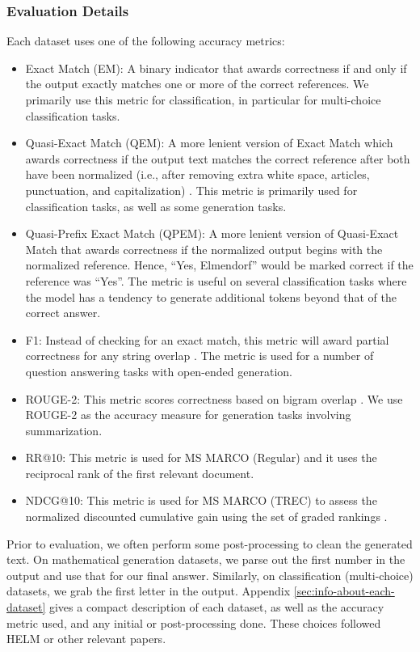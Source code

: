 \subsubsection{Evaluation Details}
Each dataset uses one of the following accuracy metrics:
\begin{itemize}
    \item Exact Match (EM): A binary indicator that awards correctness if and only if the output exactly matches one or more of the correct references. We primarily use this metric for classification, in particular for multi-choice classification tasks.
    \item Quasi-Exact Match (QEM): A more lenient version of Exact Match which awards correctness if the output text matches the correct reference after both have been normalized (i.e., after removing extra white space, articles, punctuation, and capitalization) \citep{choi-etal-2018-quac}. This metric is primarily used for classification tasks, as well as some generation tasks.
    \item Quasi-Prefix Exact Match (QPEM): A more lenient version of Quasi-Exact Match that awards correctness if the normalized output begins with the normalized reference. Hence, ``Yes, Elmendorf'' would be marked correct if the reference was ``Yes''. The metric is useful on several classification tasks where the model has a tendency to generate additional tokens beyond that of the correct answer.
    \item F1: Instead of checking for an exact match, this metric will award partial correctness for any string overlap \citep{rajpurkar-etal-2016-squad}. The metric is used for a number of question answering tasks with open-ended generation.
    \item ROUGE-2: This metric scores correctness based on bigram overlap \citep{lin-2004-rouge}. We use ROUGE-2 as the accuracy measure for generation tasks involving summarization.
    \item RR@10: This metric is used for MS MARCO (Regular) and it uses the reciprocal rank of the first relevant document. 
    \item NDCG@10: This metric is used for MS MARCO (TREC) to assess the normalized discounted cumulative gain using the set of graded rankings \citep{ndcg}. 
\end{itemize}

Prior to evaluation, we often perform some post-processing to clean the generated text. On mathematical generation datasets, we parse out the first number in the output and use that for our final answer. Similarly, on classification (multi-choice) datasets, we grab the first letter in the output. Appendix \ref{sec:info-about-each-dataset} gives a compact description of each dataset, as well as the accuracy metric used, and any initial or post-processing done. These choices followed HELM or other relevant papers. 


